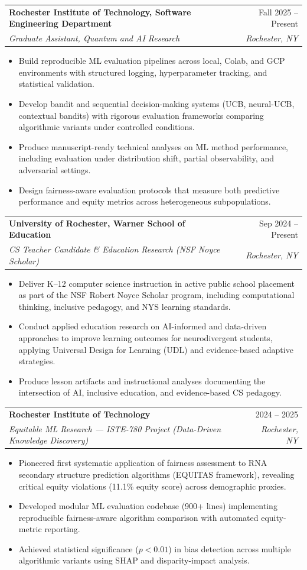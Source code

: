 \documentclass[11pt]{article}
\makeatletter
\newcommand{\entry}[4]{
  \noindent\begin{tabularx}{\textwidth}{@{}Xr@{}}
    \textbf{#1} & #2 \\
    \textit{#3} & \textit{#4}
  \end{tabularx}\vspace{2pt}
}
\makeatother
\begin{document}
\entry{Rochester Institute of Technology, Software Engineering Department}{Fall 2025 -- Present}{Graduate Assistant, Quantum and AI Research}{Rochester, NY}
\begin{itemize}
  \item Build reproducible ML evaluation pipelines across local, Colab, and GCP environments with structured logging, hyperparameter tracking, and statistical validation.
  \item Develop bandit and sequential decision-making systems (UCB, neural-UCB, contextual bandits) with rigorous evaluation frameworks comparing algorithmic variants under controlled conditions.
  \item Produce manuscript-ready technical analyses on ML method performance, including evaluation under distribution shift, partial observability, and adversarial settings.
  \item Design fairness-aware evaluation protocols that measure both predictive performance and equity metrics across heterogeneous subpopulations.
\end{itemize}

\entry{University of Rochester, Warner School of Education}{Sep 2024 -- Present}{CS Teacher Candidate \& Education Research (NSF Noyce Scholar)}{Rochester, NY}
\begin{itemize}
  \item Deliver K--12 computer science instruction in active public school placement as part of the NSF Robert Noyce Scholar program, including computational thinking, inclusive pedagogy, and NYS learning standards.
  \item Conduct applied education research on AI-informed and data-driven approaches to improve learning outcomes for neurodivergent students, applying Universal Design for Learning (UDL) and evidence-based adaptive strategies.
  \item Produce lesson artifacts and instructional analyses documenting the intersection of AI, inclusive education, and evidence-based CS pedagogy.
\end{itemize}

\entry{Rochester Institute of Technology}{2024 -- 2025}{Equitable ML Research --- ISTE-780 Project (Data-Driven Knowledge Discovery)}{Rochester, NY}
\begin{itemize}
  \item Pioneered first systematic application of fairness assessment to RNA secondary structure prediction algorithms (EQUITAS framework), revealing critical equity violations (11.1\% equity score) across demographic proxies.
  \item Developed modular ML evaluation codebase (900+ lines) implementing reproducible fairness-aware algorithm comparison with automated equity-metric reporting.
  \item Achieved statistical significance ($p < 0.01$) in bias detection across multiple algorithmic variants using SHAP and disparity-impact analysis.
\end{itemize}
\end{document}
